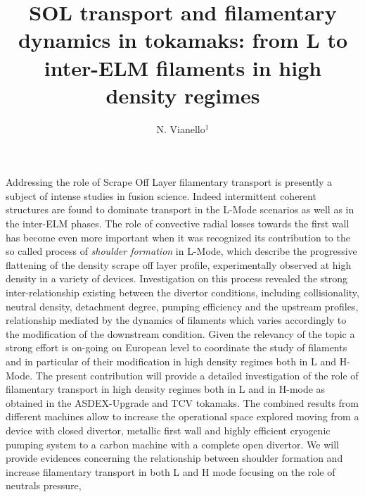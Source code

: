 \documentclass{epsconf}
\title{SOL transport and filamentary dynamics in tokamaks: from L to
  inter-ELM filaments in high density regimes}
\author{N. Vianello$^{1}$}
\institute{$^{1}$ Consorzio RFX (CNR, ENEA, INFN, Universit{\'a} di Padova, Acciaierie Venete SpA), C.so Stati Uniti 4, 35127, Padova, Italy}
\begin{document}
\maketitle
Addressing the role of Scrape Off Layer filamentary transport is
presently a subject of intense studies in fusion science. Indeed
intermittent coherent structures are found to dominate transport in
the L-Mode scenarios as well as in the inter-ELM phases.
The role of convective radial losses towards the first
wall has become even more important when it was recognized its
contribution 
to the so called process of \emph{shoulder formation} in
L-Mode, which describe the progressive flattening of the density
scrape off layer profile, experimentally observed at high density in a variety of
devices\cite{LaBombard:2001ks,Carralero:2015gu,Militello:2016hk,Vianello:2017ku}. Investigation on this process revealed the strong
inter-relationship existing between the divertor conditions, including
collisionality, neutral density, detachment degree, pumping efficiency and the upstream profiles,
relationship mediated by the dynamics of filaments which varies
accordingly to the modification of the downstream condition. Given the
relevancy of the topic a strong effort is on-going on European level
to coordinate the study of filaments and in particular of their
modification in high density regimes both in L and H-Mode. The present
contribution will provide a detailed investigation of the role of
filamentary transport in high density regimes both in L and in H-mode
as obtained in the ASDEX-Upgrade and TCV tokamaks. The combined
results from different machines allow to increase the operational
space explored moving from a device with closed divertor,  metallic
first wall and highly efficient cryogenic pumping system to a carbon
machine with a complete open divertor. We will provide evidences
concerning the relationship between shoulder formation and increase
filamentary transport in both L and H mode focusing on the role of
neutrals pressure, 

\begingroup
{}
\printbibliography
\endgroup
\end{document}
